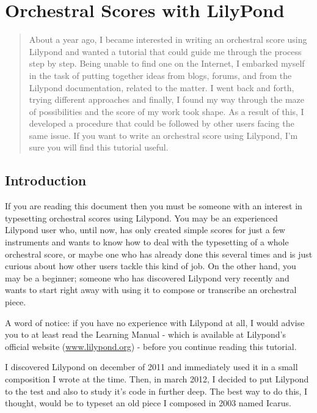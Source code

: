 \documentclass{scrreprt}
\begin{document}
\chapter{Orchestral Scores with LilyPond}

\begin{abstract}
About a year ago, I became interested in writing an orchestral score using Lilypond and wanted a tutorial that could guide me through the process step by step. 
Being unable to find one on the Internet, I embarked myself in the task of putting together ideas from blogs, forums, and from the Lilypond documentation, related to the matter.
I went back and forth, trying different approaches and finally, I found my way through the maze of possibilities and the score of my work took shape.
As a result of this, I developed a procedure that could be followed by other users facing the same issue.
If you want to write an orchestral score using Lilypond, I'm sure you will find this tutorial useful.
\end{abstract}

\section{Introduction}

If you are reading this document then you must be someone with an interest in typesetting orchestral scores using Lilypond.
You may be an experienced Lilypond user who, until now, has only created simple scores for just a few instruments and wants to know how to deal with the typesetting of a whole orchestral score, or maybe one who has already done this several times and is just curious about how other users tackle this kind of job.
On the other hand, you may be a beginner; someone who has discovered Lilypond very recently and wants to start right away with using it to compose or transcribe an orchestral piece.

A word of notice: if you have no experience with Lilypond at all, I would advise you to at least read the Learning Manual - which is available at Lilypond's official website (\url{www.lilypond.org}) - before you continue reading this tutorial.

I discovered Lilypond on december of 2011 and immediately used it in a small composition I wrote at the time. Then, in march 2012, I decided to put Lilypond to the test and also to study it's code in further deep.
The best way to do this, I thought, would be to typeset an old piece I composed in 2003 named Icarus.
\end{document}
